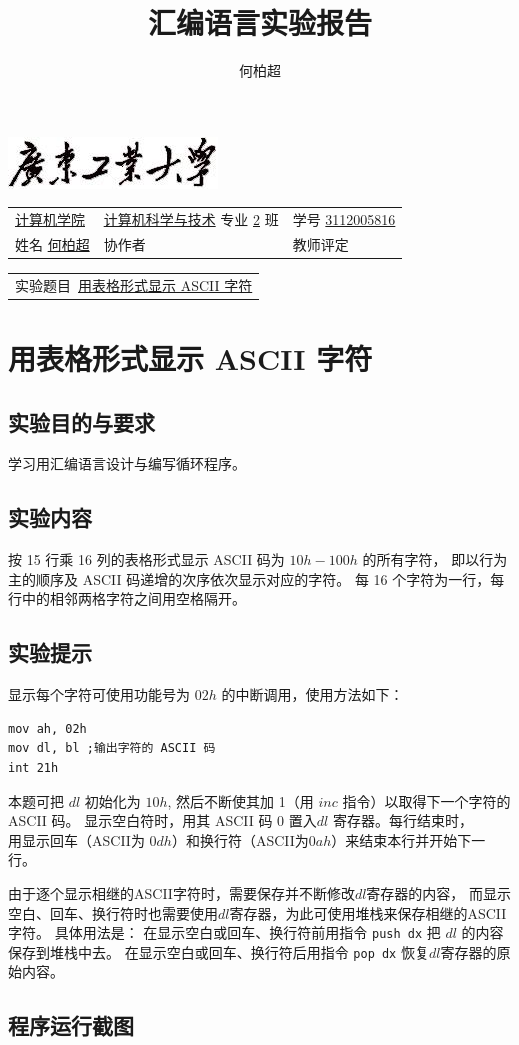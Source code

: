 \documentclass[a4paper,12pt]{article}
\title{汇编语言实验报告}
\author{何柏超}
\newcommand{\labtitle}[1] {
    \centerline{\includegraphics[scale=0.5]{resource/chapter-caption}}

    \begin{tabular}{ l l l }
        \\  %
        \underline{\hspace{3pt} 计算机学院 \hspace{3pt}} &
            \underline{计算机科学与技术} 专业 \underline{2} 班 &
            学号 \underline{3112005816} \\[3pt]

        姓名 \underline{\hspace{3pt} 何柏超 \hspace{3pt}} &
            协作者 \underline{\hspace{50pt}} &
            教师评定 \underline{\hspace{35pt}} \\[3pt]
    \end{tabular}

    \begin{tabular}{l}
    实验题目\ \underline{#1} \\[3pt]
    \end{tabular}
    \section{#1}
}
\begin{document}


\labtitle{用表格形式显示 ASCII 字符}

\subsection{实验目的与要求}

学习用汇编语言设计与编写循环程序。

\subsection{实验内容}

按 15 行乘 16 列的表格形式显示 ASCII 码为 $10h - 100h$ 的所有字符，
即以行为主的顺序及 ASCII 码递增的次序依次显示对应的字符。
每 16 个字符为一行，每行中的相邻两格字符之间用空格隔开。

\subsection{实验提示}

显示每个字符可使用功能号为 $02h$ 的中断调用，使用方法如下：

\begin{lstlisting}
mov ah, 02h
mov dl, bl ;输出字符的 ASCII 码
int 21h
\end{lstlisting}

本题可把 $dl$ 初始化为 $10h$, 然后不断使其加 1（用 $inc$ 指令）以取得下一个字符的 ASCII 码。
显示空白符时，用其 ASCII 码 $0$ 置入$dl$ 寄存器。每行结束时，\\
用显示回车（ASCII为 $0dh$）和换行符（ASCII为$0ah$）来结束本行并开始下一行。

由于逐个显示相继的ASCII字符时，需要保存并不断修改$dl$寄存器的内容，
而显示空白、回车、换行符时也需要使用$dl$寄存器，为此可使用堆栈来保存相继的ASCII字符。 
具体用法是：
在显示空白或回车、换行符前用指令 \lstinline|push dx| 把 $dl$ 的内容保存到堆栈中去。
在显示空白或回车、换行符后用指令 \lstinline|pop dx| 恢复$dl$寄存器的原始内容。

\pagebreak

\subsection{程序运行截图}
\end{document}
